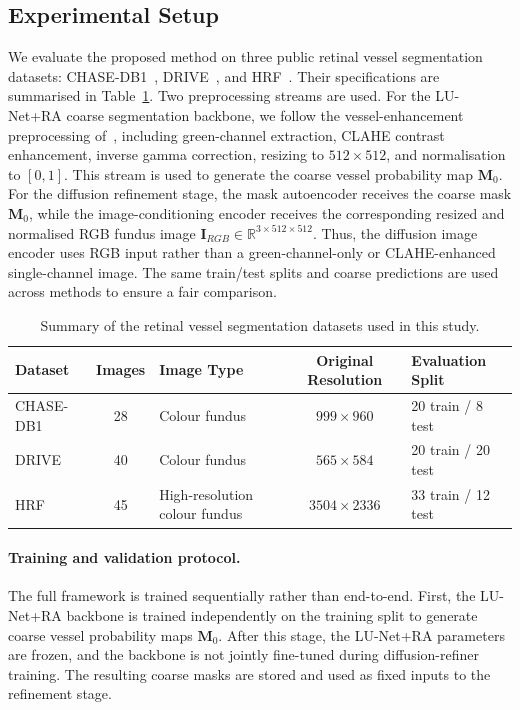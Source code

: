 \documentclass[journal,article,submit,pdftex,moreauthors]{Definitions/mdpi}
\begin{document}
\subsection{Experimental Setup}
We evaluate the proposed method on three public retinal vessel segmentation datasets: CHASE-DB1~\cite{CHASEDB1}, DRIVE~\cite{Staal2004}, and HRF~\cite{Odstrcilik2013HRF}. Their specifications are summarised in Table~\ref{tab:datasets}. Two preprocessing streams are used. For the LU-Net+RA coarse segmentation backbone, we follow the vessel-enhancement preprocessing of~\cite{Hernandez2025}, including green-channel extraction, CLAHE contrast enhancement, inverse gamma correction, resizing to $512\times512$, and normalisation to $[0,1]$. This stream is used to generate the coarse vessel probability map $\mathbf{M}_0$. For the diffusion refinement stage, the mask autoencoder receives the coarse mask $\mathbf{M}_0$, while the image-conditioning encoder receives the corresponding resized and normalised RGB fundus image $\mathbf{I}_{RGB}\in\mathbb{R}^{3\times512\times512}$. Thus, the diffusion image encoder uses RGB input rather than a green-channel-only or CLAHE-enhanced single-channel image. The same train/test splits and coarse predictions are used across methods to ensure a fair comparison.



\begin{table}[H]
\centering
\caption{Summary of the retinal vessel segmentation datasets used in this study.}
\label{tab:datasets}
\small
\begin{tabularx}{\textwidth}{l c X c X}
\toprule
Dataset & Images & Image Type & Original Resolution & Evaluation Split \\
\midrule
CHASE-DB1 & 28 & Colour fundus & $999\times960$ & 20 train / 8 test \\
DRIVE & 40 & Colour fundus & $565\times584$ & 20 train / 20 test \\
HRF & 45 & High-resolution colour fundus & $3504\times2336$ & 33 train / 12 test \\
\bottomrule
\end{tabularx}
\end{table}


\paragraph{Training and validation protocol.}
The full framework is trained sequentially rather than end-to-end. First, the LU-Net+RA backbone is trained independently on the training split to generate coarse vessel probability maps $\mathbf{M}_0$. After this stage, the LU-Net+RA parameters are frozen, and the backbone is not jointly fine-tuned during diffusion-refiner training. The resulting coarse masks are stored and used as fixed inputs to the refinement stage.
\end{document}
